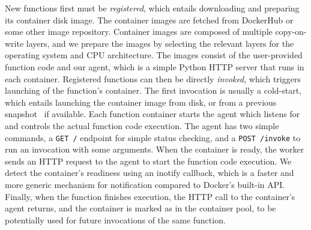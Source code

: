 New functions first must be \emph{registered}, which entails downloading and preparing its container disk image.
The container images are fetched from DockerHub or some other image repository.
Container images are composed of multiple copy-on-write layers, and we prepare the images by selecting the relevant layers for the operating system and CPU architecture.
The images consist of the user-provided function code and our agent, which is a simple Python HTTP server that runs in each container. 
%
Registered functions can then be directly \emph{invoked}, which triggers launching of the function's container.
The first invocation is usually a cold-start, which entails launching the container image from disk, or from a previous snapshot~\cite{ustiugov2021benchmarking, ao2022faasnap} if available. 
Each function container starts the agent which listens for and controls the actual function code execution. 
The agent has two simple commands, a \texttt{GET /} endpoint for simple status checking, and a \texttt{POST /invoke} to run an invocation with some arguments.
When the container is ready, the worker sends an HTTP request to the agent to start the function code execution. 
We detect the container's readiness using an inotify callback, which is a faster and more generic mechanism for notification compared to Docker's built-in API. 
%
Finally, when the function finishes execution, the HTTP call to the container's agent returns, and the container is marked as  in the container pool, to be potentially used for future invocations of the same function.

